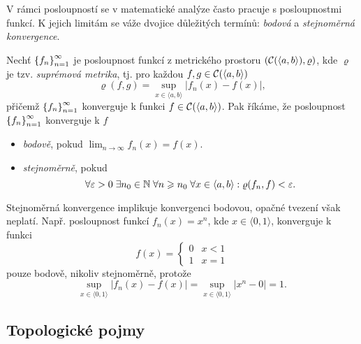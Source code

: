 V rámci posloupností se v matematické analýze často pracuje s posloupnostmi funkcí. K jejich limitám se váže dvojice důležitých termínů: \emph{bodová} a \emph{stejnoměrná konvergence}.
\begin{definition}\label{def:bodova-stejnomerna-konvergence}
    Nechť $\left\{f_n\right\}_{n=1}^\infty$ je posloupnost funkcí z metrického prostoru $(\mathcal{C}(\langle a,b\rangle),\varrho)$, kde $\varrho$ je tzv. \emph{suprémová metrika}, tj. pro každou $f,g\in \mathcal{C}(\langle a,b\rangle)$
    \[\varrho(f,g)=\sup_{x\in\langle a,b\rangle}|f_n(x)-f(x)|,\]
    přičemž $\left\{f_n\right\}_{n=1}^\infty$ konverguje k funkci $f\in \mathcal{C}(\langle a,b\rangle)$.
    Pak říkáme, že posloupnost $\left\{f_n\right\}_{n=1}^\infty$ konverguje k $f$
    \begin{itemize}
        \item \emph{bodově}, pokud $\lim_{n\to\infty}f_n(x)=f(x)$.
        \item \emph{stejnoměrně}, pokud
        \[\forall\varepsilon>0\;\exists n_0\in\mathbb{N}\;\forall n\geqslant n_0\;\forall x\in\langle a,b\rangle: \varrho(f_n,f)<\varepsilon.\]
    \end{itemize}
\end{definition}
Stejnoměrná konvergence implikuje konvergenci bodovou, opačné tvezení však neplatí. Např. posloupnost funkcí $f_n(x)=x^n$, kde $x\in\langle 0,1\rangle$, konverguje k funkci 
\[f(x)=\begin{cases}
    0 & x < 1\\
    1 & x = 1
\end{cases}\]
pouze bodově, nikoliv stejnoměrně, protože
\[\sup_{x\in\langle 0,1\rangle}|f_n(x)-f(x)|=\sup_{x\in\langle 0,1\rangle}|x^n-0|=1.\]

\subsection{Topologické pojmy}\label{subsec:topologicke-pojmy}

